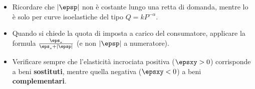 \begin{esame}
\begin{itemize}
    \item Ricordare che $|\epsp|$ non è costante lungo una retta di domanda, mentre lo è solo per curve isoelastiche del tipo $Q = k P^{-\alpha}$.
    \item Quando si chiede la quota di imposta a carico del consumatore, applicare la formula $\frac{\eps_s}{\eps_s + |\epsp|}$ (e non $|\epsp|$ a numeratore).
    \item Verificare sempre che l'elasticità incrociata positiva ($\epsxy > 0$) corrisponde a beni \textbf{sostituti}, mentre quella negativa ($\epsxy < 0$) a beni \textbf{complementari}.
\end{itemize}
\end{esame}
